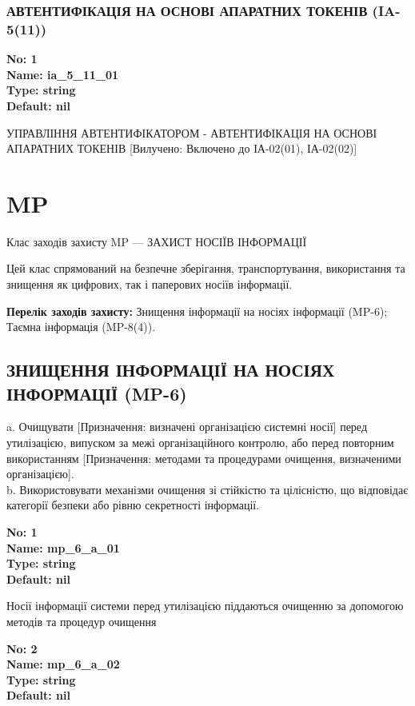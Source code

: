 \documentclass{article}
\begin{document}
\subsubsection{АВТЕНТИФІКАЦІЯ НА ОСНОВІ АПАРАТНИХ ТОКЕНІВ (IA-5(11))}


\vspace{10pt}
{\footnotesize\bfseries
No: 1\\
Name: ia\_\allowbreak{}5\_\allowbreak{}11\_\allowbreak{}01\\
Type: string\\
Default: nil
}

{\footnotesize УПРАВЛІННЯ АВТЕНТИФІКАТОРОМ - АВТЕНТИФІКАЦІЯ НА ОСНОВІ АПАРАТНИХ ТОКЕНІВ [Вилучено: Включено до ІА-02(01), ІА-02(02)]}




\section{MP}
Клас заходів захисту MP --- ЗАХИСТ НОСІЇВ ІНФОРМАЦІЇ

Цей клас спрямований на безпечне зберігання, транспортування, використання та знищення як цифрових, так і паперових носіїв інформації.

\textbf{Перелік заходів захисту:} Знищення інформації на носіях інформації (MP-6); Таємна інформація (MP-8(4)).

\subsection{ЗНИЩЕННЯ ІНФОРМАЦІЇ НА НОСІЯХ ІНФОРМАЦІЇ (MP-6)}
a. Очищувати [Призначення: визначені організацією системні носії] перед утилізацією, випуском за межі організаційного контролю, або перед повторним використанням [Призначення: методами та процедурами очищення, визначеними організацією].\\ 
b. Використовувати механізми очищення зі стійкістю та цілісністю, що відповідає категорії безпеки або рівню секретності інформації.

\vspace{10pt}
{\footnotesize\bfseries
No: 1\\
Name: mp\_\allowbreak{}6\_\allowbreak{}a\_\allowbreak{}01\\
Type: string\\
Default: nil
}

{\footnotesize Носії інформації системи перед утилізацією піддаються очищенню за допомогою методів та процедур очищення}


{\footnotesize\bfseries
No: 2\\
Name: mp\_\allowbreak{}6\_\allowbreak{}a\_\allowbreak{}02\\
Type: string\\
Default: nil
}
\end{document}
